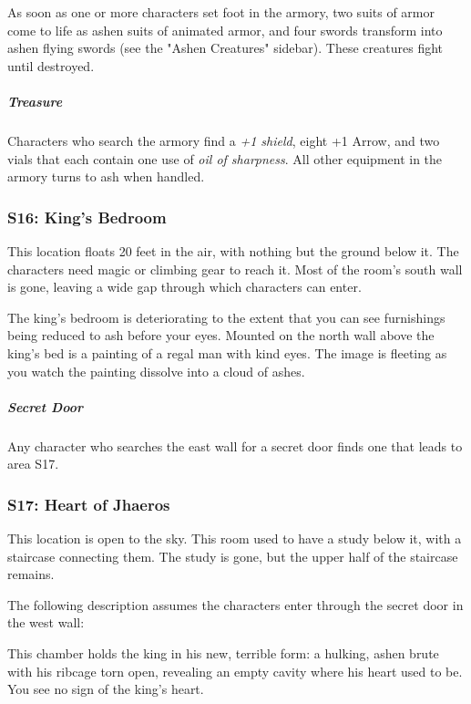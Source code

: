 \documentclass[10pt,a4paper,twoside,bg=print,twocolumn,openany,nodeprecatedcode]{dndbook}
\begin{document}
As soon as one or more characters set foot in the armory, two suits of armor come to life as ashen suits of animated armor, and four swords transform into ashen flying swords (see the "Ashen Creatures" sidebar). These creatures fight until destroyed.

\subparagraph{Treasure}
Characters who search the armory find a \textit{+1 shield}, eight +1 Arrow, and two vials that each contain one use of \textit{oil of sharpness}. All other equipment in the armory turns to ash when handled.

\subsubsection{S16: King's Bedroom}
This location floats 20 feet in the air, with nothing but the ground below it. The characters need magic or climbing gear to reach it. Most of the room's south wall is gone, leaving a wide gap through which characters can enter.

\begin{DndReadAloud}{}
The king's bedroom is deteriorating to the extent that you can see furnishings being reduced to ash before your eyes. Mounted on the north wall above the king's bed is a painting of a regal man with kind eyes. The image is fleeting as you watch the painting dissolve into a cloud of ashes.

\end{DndReadAloud}

\subparagraph{Secret Door}
Any character who searches the east wall for a secret door finds one that leads to area S17.

\subsubsection{S17: Heart of Jhaeros}
This location is open to the sky. This room used to have a study below it, with a staircase connecting them. The study is gone, but the upper half of the staircase remains.

The following description assumes the characters enter through the secret door in the west wall:

\begin{DndReadAloud}{}
This chamber holds the king in his new, terrible form: a hulking, ashen brute with his ribcage torn open, revealing an empty cavity where his heart used to be. You see no sign of the king's heart.

\end{DndReadAloud}
\end{document}
